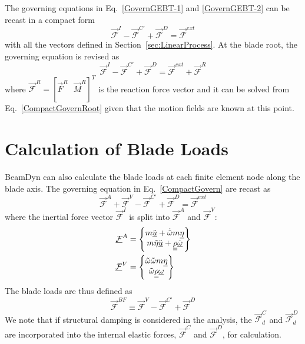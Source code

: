 The governing equations in Eq.~\ref{GovernGEBT-1} and \ref{GovernGEBT-2} can be recast in a compact form
\begin{equation}
    \label{CompactGovern}
    \vec{\mathcal{F}}^I - \vec{\mathcal{F}}^{C\prime} + \vec{\mathcal{F}}^D = \vec{\mathcal{F}}^{ext}
\end{equation}
with all the vectors defined in Section~\ref{sec:LinearProcess}.  
At the blade root, the governing equation is revised as
\begin{equation}
    \label{CompactGovernRoot}
    \vec{\mathcal{F}}^I - \vec{\mathcal{F}}^{C\prime} + \vec{\mathcal{F}}^D = \vec{\mathcal{F}}^{ext}+\vec{\mathcal{F}}^R
\end{equation}
where $\vec{\mathcal{F}}^R = \left[ \vec{F}^R~~~\vec{M}^R\right]^T$ is the reaction force vector and it can be solved from Eq.~\ref{CompactGovernRoot} given that the motion fields are known at this point.

\section{Calculation of Blade Loads}
BeamDyn can also calculate the blade loads at each finite element node along the blade axis. 
The governing equation in Eq.~\ref{CompactGovern} are recast as
\begin{equation}
    \label{GovernBF}
     \vec{\mathcal{F}}^A + \vec{\mathcal{F}}^V - \vec{\mathcal{F}}^{C\prime} + \vec{\mathcal{F}}^D = \vec{\mathcal{F}}^{ext}
\end{equation}
where the inertial force vector $\vec{\mathcal{F}}^I$ is split into $\vec{\mathcal{F}}^A$ and $\vec{\mathcal{F}}^V$:
\begin{align}
    \label{mathcalFA}
    \underline{\mathcal{F}}^A &= \begin{Bmatrix}
    m \ddot{\underline{u}} + \dot{\tilde{\omega}}m \underline{\eta}\\
    m \tilde{\eta} \ddot{\underline{u}} + \underline{\underline{\rho}} \dot{\underline{\omega}}
    \end{Bmatrix} \\
    \label{mathcalFV}
    \underline{\mathcal{F}}^V &= \begin{Bmatrix}
    \tilde{\omega} \tilde{\omega} m \underline{\eta}\\
     \tilde{\omega} \underline{\underline{\rho}} \underline{\omega}
    \end{Bmatrix} \\    
\end{align}
The blade loads are thus defined as
\begin{equation}
    \label{BladeForce}
    \vec{\mathcal{F}}^{BF} \equiv \vec{\mathcal{F}}^V - \vec{\mathcal{F}}^{C\prime} + \vec{\mathcal{F}}^D
\end{equation}
We note that if structural damping is considered in the analysis, the $\vec{\mathcal{F}}^{C}_d$ and $\vec{\mathcal{F}}^D_d$ are incorporated into the internal elastic forces, $\vec{\mathcal{F}}^C$ and $\vec{\mathcal{F}}^D$, for calculation.
